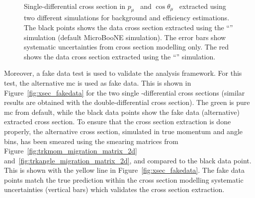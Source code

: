 \begin{figure}[]
\centering
{} 
 \\
\caption[Single-Differential Cross Section Extracted with Different Simulations]{Single-differential cross section in $p_\mu$~\protect{} and $\cos\theta_\mu$~\protect{} extracted using two different simulations for background and efficiency estimations. The black points shows the data cross section extracted using the ``\tuneone'' simulation (default MicroBooNE simulation). The error bars show systematic uncertainties from cross section modelling only. The red shows the data cross section extracted using the ``\tunethree'' simulation.}
\label{fig:xsec_tune1_tune3}
\end{figure}


Moreover, a fake data test is used to validate the analysis framework. For this test, the \g alternative  \acrshort{mc} is used as fake data. This is shown in Figure~\ref{fig:xsec_fakedata} for the two single -differential cross sections (similar results are obtained with the double-differential cross section). The green is pure \acrshort{mc} from \g default, while the black data points show the fake data (\g alternative) extracted cross section. 
To ensure that the cross section extraction is done properly, the \g alternative cross section, simulated in true momentum and angle bins, has been smeared using the smearing matrices from Figure~\ref{fig:trkmom_migration_matrix_2d} and~\ref{fig:trkangle_migration_matrix_2d}, and compared to the black data point. This is shown with the yellow line in Figure~\ref{fig:xsec_fakedata}. The fake data points match the true prediction within the cross section modelling systematic uncertainties (vertical bars) which validates the cross section extraction.

